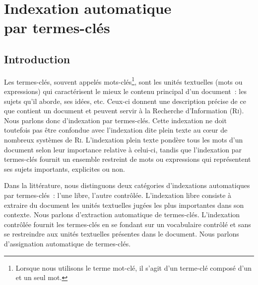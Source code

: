 \chapter[Indexation automatique par termes-clés]{Indexation automatique\\par termes-clés}
\label{part:main-state_of_the_art}
  \section{Introduction}
  \label{sec:main-state_of_the_art-introduction}
    Les termes-clés,
    souvent appelés mots-clés\footnote{Lorsque nous utilisons le terme
    \og{}mot-clé\fg{}, il s'agit d'un terme-clé composé d'un et un seul mot.},
    sont les unités textuelles (mots ou expressions) qui caractérisent le mieux
    le contenu principal d'un document~: les sujets qu'il aborde, ses idées,
    etc. Ceux-ci donnent une description précise de ce que contient un document
    et peuvent servir à la Recherche d'Information (\textsc{Ri}). Nous parlons
    donc d'indexation par termes-clés. Cette indexation ne doit toutefois pas être confondue
    avec l'indexation dite \og{}plein texte\fg{} au c\oe{}ur de nombreux
    systèmes de \textsc{Ri}. L'indexation plein texte pondère tous les mots d'un
    document selon leur importance relative à celui-ci, tandis que l'indexation
    par termes-clés fournit un ensemble restreint de mots ou expressions qui
    représentent ses sujets importants, explicites ou non.

    Dans la littérature, nous distinguons deux catégories d'indexations
    automatiques par termes-clés~: l'une libre, l'autre contrôlée. L'indexation
    libre consiste à extraire du document les unités textuelles jugées
    les plus importantes dans son contexte. Nous parlons d'extraction
    automatique de termes-clés. L'indexation contrôlée fournit les termes-clés en se fondant sur un vocabulaire
    contrôlé et sans se restreindre aux unités textuelles présentes dans le
    document. Nous parlons d'assignation automatique de
    termes-clés.

